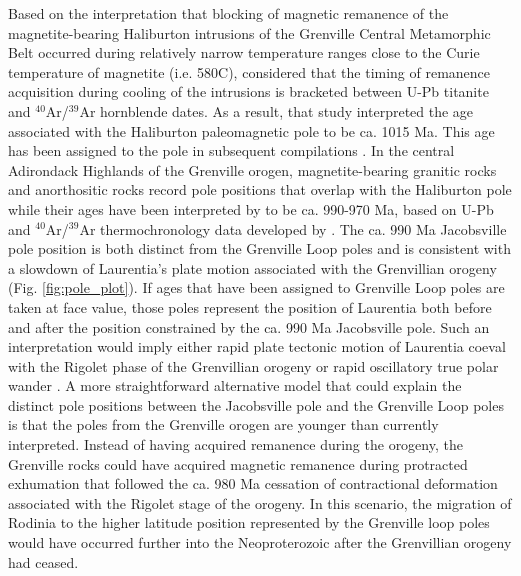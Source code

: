 Based on the interpretation that blocking of magnetic remanence of the magnetite-bearing Haliburton intrusions of the Grenville Central Metamorphic Belt occurred during relatively narrow temperature ranges close to the Curie temperature of magnetite (i.e. 580\textdegree C), \cite{Warnock2000a} considered that the timing of remanence acquisition during cooling of the intrusions is bracketed between U-Pb titanite and $^{40}$Ar/$^{39}$Ar hornblende dates. As a result, that study interpreted the age associated with the Haliburton paleomagnetic pole to be ca. 1015 Ma. This age has been assigned to the pole in subsequent compilations \cite[e.g.][]{Evans2021a}. In the central Adirondack Highlands of the Grenville orogen, magnetite-bearing granitic rocks and anorthositic rocks record pole positions that overlap with the Haliburton pole while their ages have been interpreted by \cite{Brown2012a} to be ca. 990-970 Ma, based on U-Pb and $^{40}$Ar/$^{39}$Ar thermochronology data developed by \cite{Mezger1991a}. The ca. 990 Ma Jacobsville pole position is both distinct from the Grenville Loop poles and is consistent with a slowdown of Laurentia's plate motion associated with the Grenvillian orogeny (Fig. \ref{fig:pole_plot}). If ages that have been assigned to Grenville Loop poles are taken at face value, those poles represent the position of Laurentia both before and after the position constrained by the ca. 990 Ma Jacobsville pole. Such an interpretation would imply either rapid plate tectonic motion of Laurentia coeval with the Rigolet phase of the Grenvillian orogeny or rapid oscillatory true polar wander \cite[e.g.][]{Evans2003a}. A more straightforward alternative model that could explain the distinct pole positions between the Jacobsville pole and the Grenville Loop poles is that the poles from the Grenville orogen are younger than currently interpreted. Instead of having acquired remanence during the orogeny, the Grenville rocks could have acquired magnetic remanence during protracted exhumation that followed the ca. 980 Ma cessation of contractional deformation associated with the Rigolet stage of the orogeny. In this scenario, the migration of Rodinia to the higher latitude position represented by the Grenville loop poles would have occurred further into the Neoproterozoic after the Grenvillian orogeny had ceased.  

